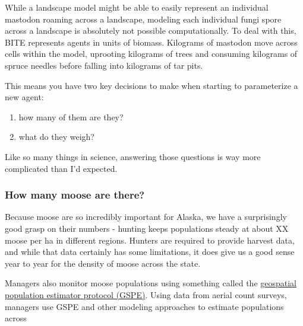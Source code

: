 \documentclass[
  letterpaper,
  DIV=11,
  numbers=noendperiod,
  oneside]{scrartcl}
\begin{document}
While a landscape model might be able to easily represent an individual
mastodon roaming across a landscape, modeling each individual fungi
spore across a landscape is absolutely not possible computationally. To
deal with this, BITE represents agents in units of biomass. Kilograms of
mastodon move across cells within the model, uprooting kilograms of
trees and consuming kilograms of spruce needles before falling into
kilograms of tar pits.

This means you have two key decisions to make when starting to
parameterize a new agent:

\begin{enumerate}
\def\labelenumi{\arabic{enumi}.}
\item
  how many of them are they?
\item
  what do they weigh?
\end{enumerate}

Like so many things in science, answering those questions is way more
complicated than I'd expected.

\hypertarget{how-many-moose-are-there}{%
\subsubsection{How many moose are
there?}\label{how-many-moose-are-there}}

Because moose are so incredibly important for Alaska, we have a
surprisingly good grasp on their numbers - hunting keeps populations
steady at about XX moose per ha in different regions. Hunters are
required to provide harvest data, and while that data certainly has some
limitations, it does give us a good sense year to year for the density
of moose across the state.

Managers also monitor moose populations using something called the
\href{https://www.nps.gov/articles/000/moose-abundance-estimates.htm\#:~:text=In\%20Alaska\%20and\%20Canada\%2C\%20moose,geospatial\%20population\%20estimator\%20(GSPE).}{geospatial
population estimator protocol (GSPE)}. Using data from aerial count
surveys, managers use GSPE and other modeling approaches to estimate
populations across
\end{document}
